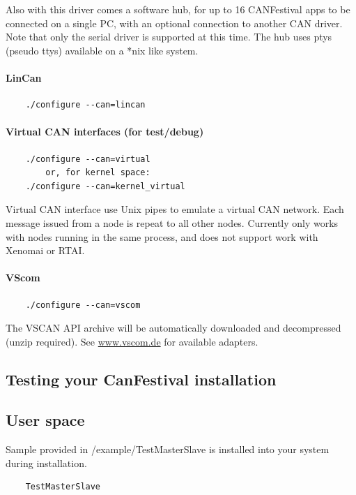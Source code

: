 \documentclass[12pt,english,a4paper]{book}
\begin{document}
Also with this driver comes a software hub, for up to 16 CANFestival apps to 
be connected on a single PC, with an optional connection to another CAN driver.
Note that only the serial driver is supported at this time.  The hub uses ptys 
(pseudo ttys) available on a *nix like system.

\paragraph{LinCan}
\begin{verbatim}
	./configure --can=lincan
\end{verbatim}

\paragraph{Virtual CAN interfaces (for test/debug)}
\begin{verbatim}
	./configure --can=virtual
		or, for kernel space:
	./configure --can=kernel_virtual
\end{verbatim}
Virtual CAN interface use Unix pipes to emulate a virtual CAN network.
Each message issued from a node is repeat to all other nodes. Currently
only works with nodes running in the same process, and does not support
work with Xenomai or RTAI.

\paragraph{VScom}
\begin{verbatim}
	./configure --can=vscom
\end{verbatim}
The VSCAN API archive will be automatically downloaded and decompressed (unzip required). See \href{http://www.vscom.de/1_1_05.htm}{www.vscom.de} for available adapters.
\subsection{Testing your CanFestival installation}

\subsection{User space}

Sample provided in /example/TestMasterSlave is installed into your
system during installation.


\begin{verbatim}
	TestMasterSlave
\end{verbatim}
\end{document}

